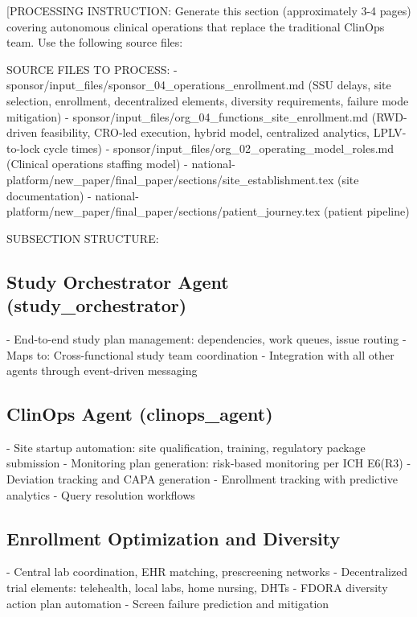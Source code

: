 
[PROCESSING INSTRUCTION: Generate this section (approximately 3-4 pages) covering autonomous
clinical operations that replace the traditional ClinOps team. Use the following source files:

SOURCE FILES TO PROCESS:
- sponsor/input\_files/sponsor\_04\_operations\_enrollment.md (SSU delays, site selection, enrollment,
  decentralized elements, diversity requirements, failure mode mitigation)
- sponsor/input\_files/org\_04\_functions\_site\_enrollment.md (RWD-driven feasibility, CRO-led
  execution, hybrid model, centralized analytics, LPLV-to-lock cycle times)
- sponsor/input\_files/org\_02\_operating\_model\_roles.md (Clinical operations staffing model)
- national-platform/new\_paper/final\_paper/sections/site\_establishment.tex (site documentation)
- national-platform/new\_paper/final\_paper/sections/patient\_journey.tex (patient pipeline)

SUBSECTION STRUCTURE:

\subsection{Study Orchestrator Agent (study\_orchestrator)}
- End-to-end study plan management: dependencies, work queues, issue routing
- Maps to: Cross-functional study team coordination
- Integration with all other agents through event-driven messaging

\subsection{ClinOps Agent (clinops\_agent)}
- Site startup automation: site qualification, training, regulatory package submission
- Monitoring plan generation: risk-based monitoring per ICH E6(R3)
- Deviation tracking and CAPA generation
- Enrollment tracking with predictive analytics
- Query resolution workflows

\subsection{Enrollment Optimization and Diversity}
- Central lab coordination, EHR matching, prescreening networks
- Decentralized trial elements: telehealth, local labs, home nursing, DHTs
- FDORA diversity action plan automation
- Screen failure prediction and mitigation

